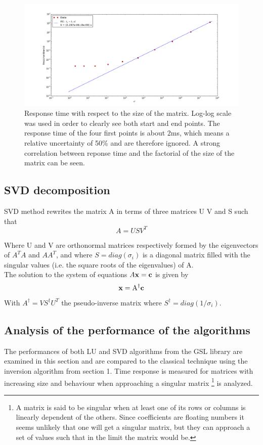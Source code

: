 \documentclass[10 pt]{article}
\begin{document}
\begin{figure}[H]
\includegraphics[width=\linewidth]{plot_time_size_matrix}
\caption{Response time with respect to the size of the matrix. Log-log scale was used in order to clearly see both start and end points. The response time of the four first points is about 2ms, which means a relative uncertainty of 50\% and are therefore ignored. A strong correlation between reponse time and the factorial of the size of the matrix can be seen.}
\end{figure}
\newpage
\begin{multicols}{2}


\subsection{SVD decomposition}
SVD method rewrites the matrix A in terms of three matrices U V and S such that
\begin{equation}
A = USV^{T}
\end{equation}

Where U and V are orthonormal matrices respectively formed by the eigenvectors of $A^{T}A$ and $AA^{T}$, and where $S = diag(\sigma_i)$ is a diagonal matrix filled with the singular values (i.e. the square roots of the eigenvalues) of A.\\
The solution to the system of equations $A \bf x \rm = \bf c$ is given by
\begin{equation}
\bf x \rm = A^{\dagger} \bf c
\end{equation}
With $A^{\dagger} = V S^{\dagger} U^{T}$ the pseudo-inverse matrix where $S^{\dagger} = diag(1/\sigma_{i})$.

\subsection{Analysis of the performance of the algorithms}
The performances of both LU and SVD algorithms from the GSL library are examined in this section and are compared to the classical technique using the inversion algorithm from section 1.
Time response is measured for matrices with increasing size and behaviour when approaching a singular matrix
\footnote{A matrix is said to be singular when at least one of its rows or columns is linearly dependent of the others. Since coefficients are floating numbers it seems unlikely that one will get a singular matrix, but they can approach a set of values such that in the limit the matrix would be.}
 is analyzed.
\end{multicols}
\end{document}
